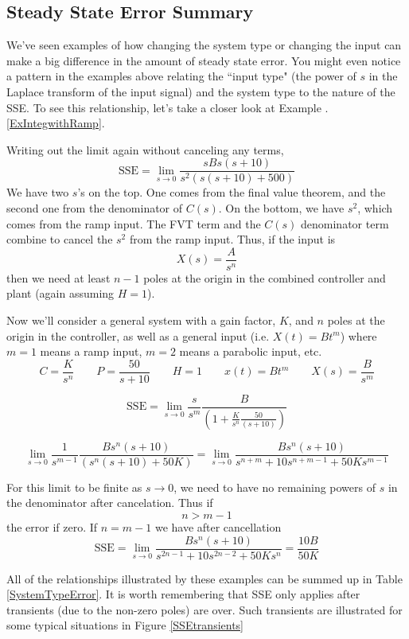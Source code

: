 \subsection{Steady State Error Summary}

We've seen examples of how changing the system type or changing the input can make a big difference in the amount of steady state error.  You might even notice a pattern in the examples above relating the ``input type" (the power of $s$ in the Laplace transform of the input signal) and the system type to the nature of the SSE.  To see this relationship, let's take a closer look at Example \thechapter.\ref{ExIntegwithRamp}.

Writing out the limit again without canceling any terms,
\[
\mathrm{SSE} = \lim_{s\to 0} \frac{sBs(s+10)}{s^2(s(s+10)+500)}
\]
We have two $s$'s on the top.  One comes from the final value theorem, and the second one from the denominator of $C(s)$.  On the bottom, we have $s^2$, which comes from the ramp input.    The FVT term and the $C(s)$ denominator term combine to cancel the $s^2$ from the ramp input.   Thus, if the input is
\[
X(s) = \frac{A}{s^n}
\]
then we need at least $n-1$ poles at the origin in the combined controller and plant (again assuming $H=1$).


\begin{ExampleSmall}
Now we'll consider a general system with a gain factor, $K$, and $n$ poles at the origin in the controller, as well as a general input (i.e. $X(t) = Bt^m$) where $m=1$ means a ramp input, $m=2$ means a parabolic input, etc.
\[
C = \frac{K}{s^n} \qquad P = \frac{50}{s+10} \qquad H = 1 \qquad x(t) = Bt^m \qquad X(s) = \frac{B}{s^m}
\]

\[
\mathrm{SSE} = \lim_{s\to 0} \frac{s}{s^m} \frac{B}{\left(1+\frac{K}{s^n}\frac{50}{(s+10)}\right) }
\]

\[
\lim_{s\to 0} \frac{1}{s^{m-1}} \frac {Bs^n(s+10)} {(s^n(s+10)+50K)} = \lim_{s\to 0} \frac{Bs^n(s+10)} {s^{n+m}+10s^{n+m-1} + 50Ks^{m-1}}
\]


For this limit to be finite as $s\to 0$, we need to have no remaining powers of $s$ in the denominator after cancelation.  Thus  if
\[
n > m-1
\]
the error if zero.   If $n=m-1$ we have after cancellation
\[
\mathrm{SSE} = \lim_{s\to 0} \frac  {Bs^n(s+10)}   {s^{2n-1} + 10s^{2n-2} + 50Ks^n} = \frac {10B}  {50K}
\]
\end{ExampleSmall}



All of the relationships illustrated by these examples can be summed up in Table \ref{SystemTypeError}.
It is worth remembering that SSE only applies after transients (due to the non-zero poles) are over.  Such transients are illustrated for some typical situations in Figure \ref{SSEtransients}


